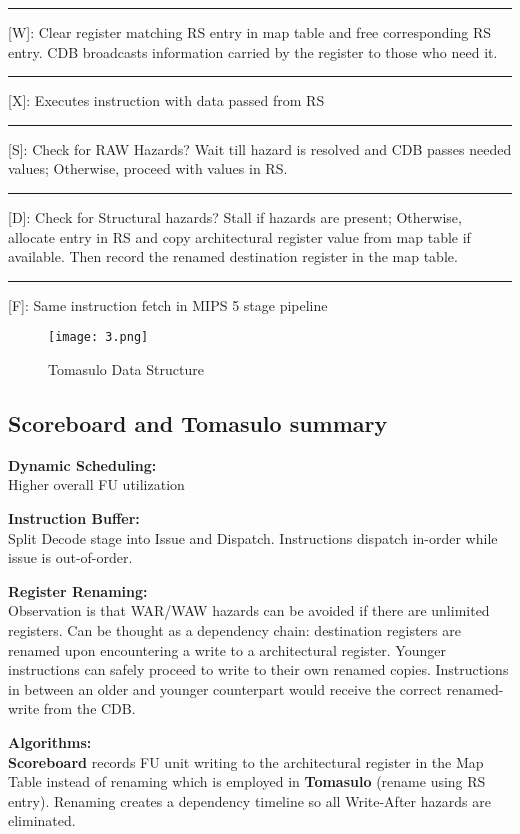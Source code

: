 \documentclass{article}
\begin{document}
\begin{multicols*}{2}
\medskip\par\noindent
\smallskip\hrule\smallskip\noindent
{[W]}: Clear register matching RS entry in map table and free corresponding RS entry. CDB broadcasts information carried by the register to those who need it. \\
\smallskip\hrule\smallskip\noindent
{[X]}: Executes instruction with data passed from RS\\
\smallskip\hrule\smallskip\noindent
{[S]}: Check for RAW Hazards? Wait till hazard is resolved and CDB passes needed values; Otherwise, proceed with values in RS. \\
\smallskip\hrule\smallskip\noindent
{[D]}: Check for Structural hazards? Stall if hazards are present; Otherwise, allocate entry in RS and copy architectural register value from map table if available. Then record the renamed destination register in the map table. \\
\smallskip\hrule\smallskip\noindent
{[F]}: Same instruction fetch in MIPS 5 stage pipeline

\begin{figure}[H]
  \centering
    {\texttt{[image: 3.png]}}
  \caption{Tomasulo Data Structure}
\end{figure}

\subsection*{Scoreboard and Tomasulo summary}
\textbf{Dynamic Scheduling:} \\
Higher overall FU utilization
\medskip\par\noindent
\textbf{Instruction Buffer:} \\
Split Decode stage into Issue and Dispatch. Instructions dispatch in-order while issue is out-of-order.
\medskip\par\noindent
\textbf{Register Renaming:} \\
Observation is that WAR/WAW hazards can be avoided if there are unlimited registers. Can be thought as a dependency chain: destination registers are renamed upon encountering a write to a architectural register. Younger instructions can safely proceed to write to their own renamed copies. Instructions in between an older and younger counterpart would receive the correct renamed-write from the CDB.
\medskip\par\noindent
\textbf{Algorithms:} \\
\textbf{Scoreboard} records FU unit writing to the architectural register in the Map Table instead of renaming which is employed in \textbf{Tomasulo} (rename using RS entry). Renaming creates a dependency timeline so all Write-After hazards are eliminated.


\end{multicols*}
\end{document}

